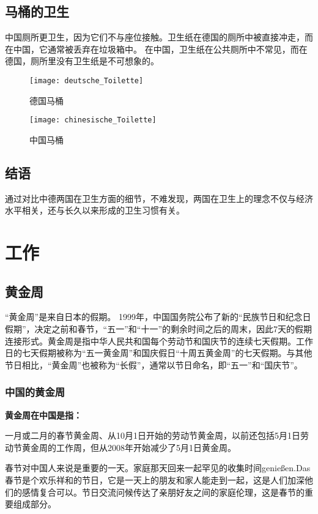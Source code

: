 \subsection{马桶的卫生}
    中国厕所更卫生，因为它们不与座位接触。卫生纸在德国的厕所中被直接冲走，而在中国，它通常被丢弃在垃圾箱中。 在中国，卫生纸在公共厕所中不常见，而在德国，厕所里没有卫生纸是不可想象的。

    \begin{figure}[htb]
        \centering
        \texttt{[image: deutsche\_Toilette]}
        \caption{德国马桶}
    \end{figure}

    \begin{figure}[htb]
        \centering
        \texttt{[image: chinesische\_Toilette]}
        \caption{中国马桶}
    \end{figure}

\subsection{结语}
通过对比中德两国在卫生方面的细节，不难发现，两国在卫生上的理念不仅与经济水平相关，还与长久以来形成的卫生习惯有关。


\section{工作}
\subsection{黄金周}

“黄金周”是来自日本的假期。 1999年，中国国务院公布了新的“民族节日和纪念日假期”，决定之前和春节，“五一”和“十一”的剩余时间之后的周末，因此7天的假期连接形式。黄金周是指中华人民共和国每个劳动节和国庆节的连续七天假期。工作日的七天假期被称为“五一黄金周”和国庆假日“十周五黄金周”的七天假期。与其他节日相比，“黄金周”也被称为“长假”，通常以节日命名，即“五一”和“国庆节”。
\subsubsection{中国的黄金周}

\textbf{黄金周在中国是指：}

一月或二月的春节黄金周、从10月1日开始的劳动节黄金周，以前还包括5月1日劳动节黄金周的工作周，但从2008年开始减少了5月1日黄金周。

春节对中国人来说是重要的一天。家庭那天回来一起罕见的收集时间genießen.Das春节是个欢乐祥和的节日，它是一天上的朋友和家人能走到一起，这是人们加深他们的感情复合可以。节日交流问候传达了亲朋好友之间的家庭伦理，这是春节的重要组成部分。

